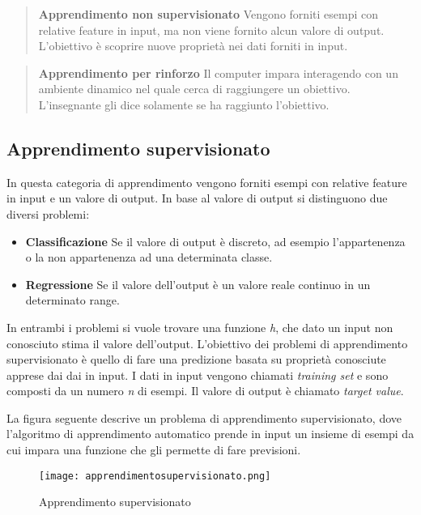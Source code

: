 \documentclass[../main.tex]{subfiles}
\begin{document}
\begin{verse}
				\textbf{Apprendimento non supervisionato} Vengono forniti esempi con relative feature in input, ma non viene fornito alcun valore di output. L'obiettivo è scoprire nuove proprietà nei dati forniti in input.
\end{verse}

\begin{verse}
				\textbf{Apprendimento per rinforzo} Il computer impara interagendo con un ambiente dinamico nel quale cerca di raggiungere un obiettivo. L'insegnante gli dice solamente se ha raggiunto l'obiettivo. 
\end{verse}

\subsection{Apprendimento supervisionato}
In questa categoria di apprendimento vengono forniti esempi con relative feature in input e un valore di output. In base al valore di output si distinguono due diversi problemi:

\begin{itemize}
				\item \textbf{Classificazione} Se il valore di output è discreto, ad esempio l'appartenenza o la non appartenenza ad una determinata classe.
				\item \textbf{Regressione} Se il valore dell'output è un valore reale continuo in un determinato range.
\end{itemize}

In entrambi i problemi si vuole trovare una funzione \textit{h}, che dato un input non conosciuto stima il valore dell'output. L'obiettivo dei problemi di apprendimento supervisionato è quello di fare una predizione basata su proprietà conosciute apprese dai dai in input.
I dati in input vengono chiamati \textit{training set} e sono composti da un numero \textit{n} di esempi. Il valore di output è chiamato \textit{target value}.

La figura seguente descrive un problema di apprendimento supervisionato, dove l'algoritmo di apprendimento automatico prende in input un insieme di esempi da cui impara una funzione che gli permette di fare previsioni.

\begin{figure}[H]
				\centering
				\texttt{[image: apprendimentosupervisionato.png]}
				\caption{Apprendimento supervisionato}
\end{figure}
\end{document}
